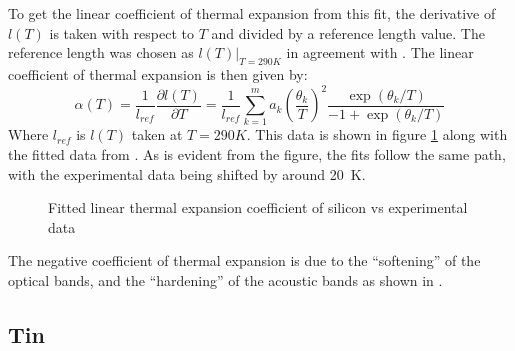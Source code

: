 \documentclass[12pt]{article}
\begin{document}
To get the linear coefficient of thermal expansion from this fit, the derivative of $l(T)$ is taken with respect to $T$ and divided by a reference length value. The reference length was chosen as $l(T)|_{T=290K}$ in agreement with \cite{middelmann2015thermal}. The linear coefficient of thermal expansion is then given by:
\begin{equation}\label{eq:linear_coefficient}
	\alpha(T) = \frac{1}{l_{ref}}\frac{\partial l(T)}{\partial T} =  \frac{1}{l_{ref}} \sum_{k=1}^{m}a_k \left ( \frac{\theta_k}{T} \right)^2 \frac{\exp(\theta_k/T)}{-1+\exp(\theta_k/T)}
\end{equation}
Where $l_{ref}$ is $l(T)$ taken at $T=290K$. This data is shown in figure \ref{fig:si_thermal_expansion} along with the fitted data from \cite{middelmann2015thermal}. As is evident from the figure, the fits follow the same path, with the experimental data being shifted by around \SI{20}{\kelvin}.

\begin{figure}
	\centering
	
	\caption{Fitted linear thermal expansion coefficient of silicon vs experimental data \cite{middelmann2015thermal}}
	\label{fig:si_thermal_expansion}
\end{figure}

The negative coefficient of thermal expansion is due to the ``softening'' of the optical bands, and the ``hardening'' of the acoustic bands as shown in \cite{biernacki1989negative}.
\subsection{Tin}
\end{document}
